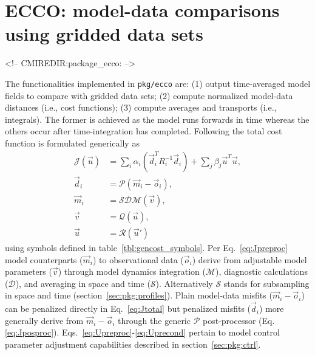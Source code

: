 \section{ECCO: model-data comparisons using gridded data sets}
\label{sec:pkg:ecco}
\begin{rawhtml}
<!-- CMIREDIR:package_ecco: -->
\end{rawhtml}

\def\mitgcmCheckpointVersion{65x}

The functionalities implemented in \texttt{pkg/ecco} are: (1) output time-averaged model fields to compare with gridded data sets; (2) compute normalized model-data distances (i.e., cost functions); (3) compute averages and transports (i.e., integrals). The former is achieved as the model runs forwards in time whereas the others occur after time-integration has completed. Following \cite{for-eta:15} the total cost function is formulated generically as
\begin{align} 
	\mathcal{J}(\vec{u}) &= \sum_i \alpha_i \left(\vec{d}_i^T R_i^{-1} \vec{d}_i\right) + \sum_j \beta_j \vec{u}^T\vec{u}, \label{eq:Jtotal} \\
	\vec{d}_i &= \mathcal{P}(\vec{m}_i - \vec{o}_i), \label{eq:Jposproc} \\
	\vec{m}_i &= \mathcal{S}\mathcal{D}\mathcal{M}(\vec{v}), \label{eq:Jpreproc} \\
	\vec{v}	  &= \mathcal{Q}(\vec{u}), \label{eq:Upreproc} \\
	\vec{u}	  &= \mathcal{R}(\vec{u}') \label{eq:Uprecond}
\end{align}
using symbols defined in table~\ref{tbl:gencost_symbols}. Per Eq.~\eqref{eq:Jpreproc} model counterparts ($\vec{m}_i$) to observational data ($\vec{o}_i$) derive from adjustable model parameters ($\vec{v}$) through model dynamics integration ($\mathcal{M}$), diagnostic calculations ($\mathcal{D}$), and averaging in space and time ($\mathcal{S}$). Alternatively $\mathcal{S}$ stands for subsampling in space and time (section~\ref{sec:pkg:profiles}). Plain model-data misfits ($\vec{m}_i-\vec{o}_i$) can be penalized directly in Eq.~\eqref{eq:Jtotal} but penalized misfits ($\vec{d}_i$) more generally derive from $\vec{m}_i-\vec{o}_i$ through the generic $\mathcal{P}$ post-processor (Eq. \eqref{eq:Jposproc}). Eqs.~\eqref{eq:Upreproc}-\eqref{eq:Uprecond} pertain to model control parameter adjustment capabilities described in section~\ref{sec:pkg:ctrl}.

